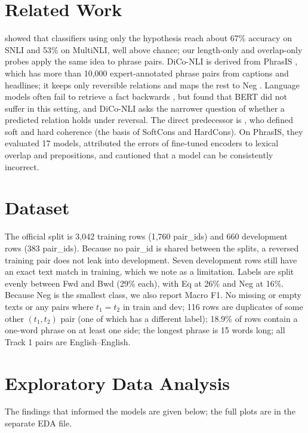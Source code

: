 \documentclass[10pt,a4paper,twocolumn]{article}
\begin{document}
\section{Related Work}

\citet{gururangan2018annotation} showed that classifiers using only the hypothesis reach about 67\% accuracy on SNLI and 53\% on MultiNLI, well above chance; our length-only and overlap-only probes apply the same idea to phrase pairs. DiCo-NLI is derived from PhrasIS \citep{lopezgazpio2024phrasis}, which has more than 10,000 expert-annotated phrase pairs from captions and headlines; it keeps only reversible relations and maps the rest to Neg \citep{diconli2026}. Language models often fail to retrieve a fact backwards \citep{berglund2024reversal}, but \citet{wu2024reversal} found that BERT did not suffer in this setting, and DiCo-NLI asks the narrower question of whether a predicted relation holds under reversal. The direct predecessor is \citet{apaolaza2026assessing}, who defined soft and hard coherence (the basis of SoftCons and HardCons). On PhrasIS, they evaluated 17 models, attributed the errors of fine-tuned encoders to lexical overlap and prepositions, and cautioned that a model can be consistently incorrect.

\section{Dataset}

The official split is 3,042 training rows (1,760 pair\_ids) and 660 development rows (383 pair\_ids). Because no pair\_id is shared between the splits, a reversed training pair does not leak into development. Seven development rows still have an exact text match in training, which we note as a limitation. Labels are split evenly between Fwd and Bwd (29\% each), with Eq at 26\% and Neg at 16\%. Because Neg is the smallest class, we also report Macro F1. No missing or empty texts or any pairs where $t_1 = t_2$ in train and dev; 116 rows are duplicates of some other $(t_1, t_2)$ pair (one of which has a different label); 18.9\% of rows contain a one-word phrase on at least one side; the longest phrase is 15 words long; all Track 1 pairs are English--English.

\section{Exploratory Data Analysis}

The findings that informed the models are given below; the full plots are in the separate EDA file.
\end{document}
